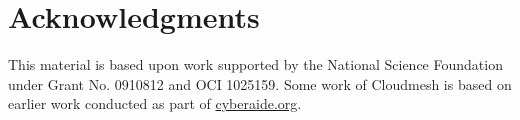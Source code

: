 \documentclass{tex/sig-alternate-2013}
\begin{document}


\section{Acknowledgments}

This material is based upon work supported by the National Science
Foundation under Grant No. 0910812 and OCI 1025159. Some work of
Cloudmesh is based on earlier work conducted as part of \url{cyberaide.org}.



% 



\balancecolumns 
\end{document}
